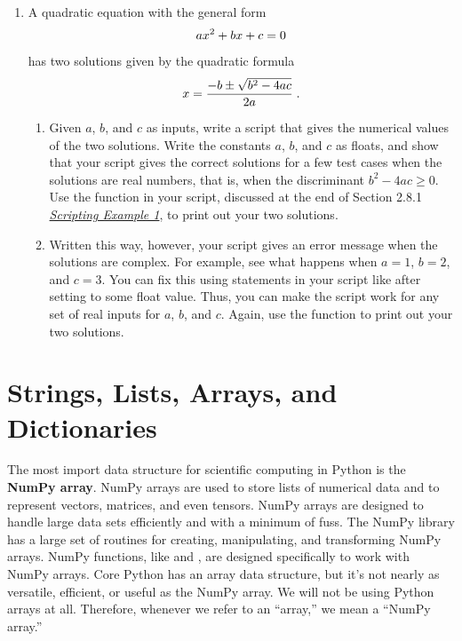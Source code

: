\documentclass[letterpaper,10pt,english]{sphinxmanual}
\begin{document}
\begin{enumerate}
\item {} 
A quadratic equation with the general form
\begin{gather}
\begin{split}ax^2+bx+c=0\end{split}\notag
\end{gather}
has two solutions given by the quadratic formula
\begin{gather}
\begin{split}x = \frac{-b \pm \sqrt{b^2-4ac}}{2a} \;.\end{split}\notag
\end{gather}\begin{enumerate}
\item {} 
Given \(a\), \(b\), and \(c\) as inputs, write a script that gives the numerical values of the two solutions.  Write the constants \(a\), \(b\), and \(c\) as floats, and show that your script gives the correct solutions for a few test cases when the solutions are real numbers, that is, when the discriminant \(b^2-4ac \ge 0\).  Use the  function in your script, discussed at the end of Section 2.8.1 {\hyperref[chap2/chap2_basics:chap2-scriptexmp1]{\emph{Scripting Example 1}}}, to print out your two solutions.

\item {} 
Written this way, however, your script gives an error message when the solutions are complex.  For example, see what happens when \(a=1\), \(b=2\), and \(c=3\).  You can fix this using statements in your script like  after setting  to some float value.  Thus, you can make the script work for any set of real inputs for \(a\), \(b\), and \(c\).  Again, use the  function to print out your two solutions.

\end{enumerate}

\end{enumerate}


\chapter{Strings, Lists, Arrays, and Dictionaries}
\label{chap3/chap3_arrays:chap3}\label{chap3/chap3_arrays:strings-lists-arrays-and-dictionaries}\label{chap3/chap3_arrays::doc}
The most import data structure for scientific computing in Python is the \textbf{NumPy array}.  NumPy arrays are used to store lists of numerical data and to represent vectors, matrices, and even tensors.  NumPy arrays are designed to handle large data sets efficiently and with a minimum of fuss.  The NumPy library has a large set of routines for creating, manipulating, and transforming NumPy arrays.  NumPy functions, like  and , are designed specifically to work with NumPy arrays.  Core Python has an array data structure, but it's not nearly as versatile, efficient, or useful as the NumPy array.  We will not be using Python arrays at all.  Therefore, whenever we refer to an ``array,'' we mean a ``NumPy array.''
\end{document}
